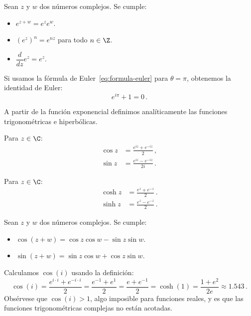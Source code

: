 \begin{prop}
  Sean $z$ y $w$ dos números complejos. Se cumple:
  \begin{itemize}
    \item $e^{z+w} = e^z e^w$.
    \item $(e^z)^n = e^{nz}$ para todo $n\in\Z$.
    \item $\dfrac{d}{dz} e^z = e^z$.
  \end{itemize}
\end{prop}

Si usamos la fórmula de Euler~\eqref{eq:formula-euler} para $\theta = \pi$, obtenemos la identidad de Euler:
\[
  e^{i\pi} + 1 = 0\,.
\]

A partir de la función exponencial definimos analíticamente las funciones trigonométricas e hiperbólicas.

\begin{defi}
  Para $z \in \C$:
  \begin{align*}
    \cos z & = \frac{e^{iz} + e^{-iz}}{2}\,,  \\
    \sin z & = \frac{e^{iz} - e^{-iz}}{2i}\,.
  \end{align*}
\end{defi}

\begin{defi}
  Para $z \in \C$:
  \begin{align*}
    \cosh z & = \frac{e^{z} + e^{-z}}{2}\,. \\
    \sinh z & = \frac{e^{z} - e^{-z}}{2}\,.
  \end{align*}
\end{defi}

\begin{prop}
  Sean $z$ y $w$ dos números complejos. Se cumple:
  \begin{itemize}
    \item $\cos(z+w) = \cos z\cos w - \sin z\sin w$.
    \item $\sin(z+w) = \sin z\cos w + \cos z\sin w$.
  \end{itemize}
\end{prop}

\begin{eje}
  Calculamos $\cos(i)$ usando la definición:
  \[
    \cos(i) = \frac{e^{i\cdot i} + e^{-i\cdot i}}{2} = \frac{e^{-1} + e^{1}}{2} = \frac{e+e^{-1}}{2} = \cosh(1) = \frac{1+e^2}{2e}\approx 1.543\,.
  \]
  Obsérvese que $\cos(i)>1$, algo imposible para funciones reales, y es que las funciones trigonométricas complejas no están acotadas.
\end{eje}

